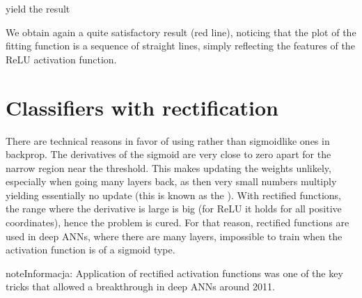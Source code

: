 \documentclass[a4paper,12pt,polish]{jupyterBook}
\begin{document}
\sphinxAtStartPar
yield the result
\begin{sphinxVerbatimOutput}

\noindent{}
\end{sphinxVerbatimOutput}

\sphinxAtStartPar
We obtain again a quite satisfactory result (red line), noticing that the plot of the fitting function is a sequence of straight lines, simply reflecting the features of the ReLU activation function.


\section{Classifiers with rectification}
\label{\detokenize{docs/rectification:classifiers-with-rectification}}
\sphinxAtStartPar
There are technical reasons in favor of using  rather than sigmoid\sphinxhyphen{}like ones in backprop. The derivatives of the sigmoid are very close to zero apart for the narrow region near the threshold. This makes updating the weights unlikely, especially when going many layers back, as then very small numbers multiply yielding essentially no update (this is known as the ). With rectified functions, the range where the derivative is large is big (for ReLU it holds for all positive coordinates), hence the problem is cured. For that reason, rectified functions are used in deep ANNs, where there are many layers, impossible to train when the activation function is of a sigmoid type.

\begin{sphinxadmonition}{note}{Informacja:}
\sphinxAtStartPar
Application of rectified activation functions was one of the key tricks that allowed a breakthrough in deep ANNs around 2011.
\end{sphinxadmonition}
\end{document}
